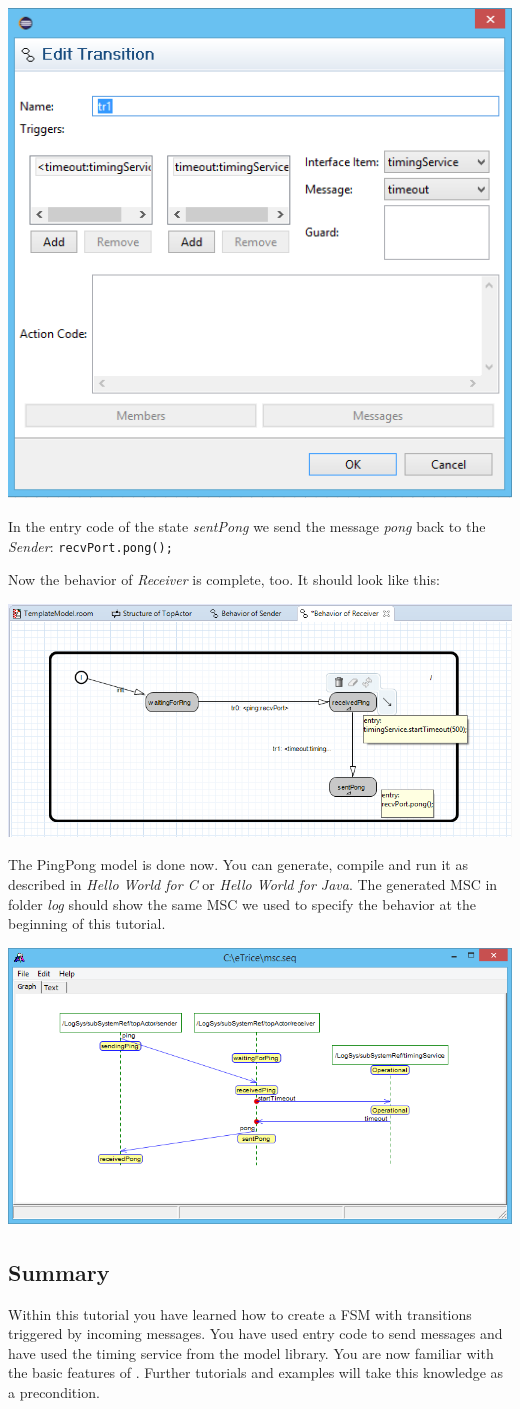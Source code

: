\includegraphics[width=.5\textwidth]{images/015-transition-timeout.png}

In the entry code of the state \emph{sentPong} we send the message \emph{pong} back to the \emph{Sender}: \verb|recvPort.pong();|

Now the behavior of \emph{Receiver} is complete, too. It should look like this:

\includegraphics[width=.8\textwidth]{images/015-sending-pong-fsm.png}

The PingPong model is done now. You can generate, compile and run it as described in \emph{Hello World for C} or \emph{Hello World for Java}. The generated MSC in folder \emph{log} should show the same MSC we used to specify the behavior at the beginning of this tutorial.

\includegraphics[width=.7\textwidth]{images/015-msc.png}

\subsection{Summary}

Within this tutorial you have learned how to create a FSM with transitions triggered by incoming messages. You have used entry code to send messages and have used the timing service from the model library. You are now familiar with the basic features of \eTrice{}. Further tutorials and examples will take this knowledge as a precondition.
